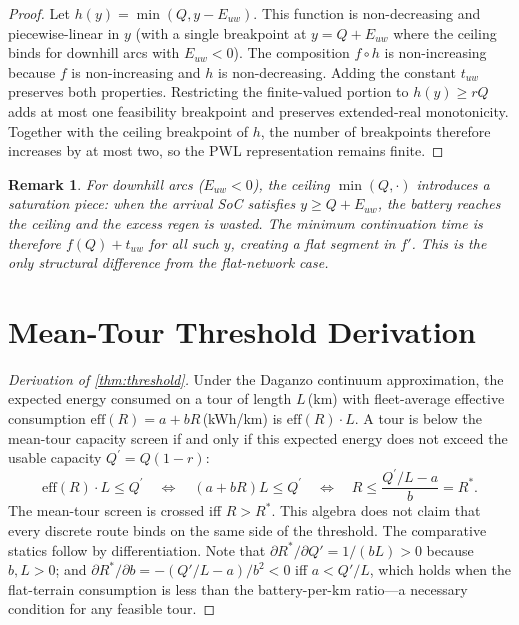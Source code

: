 \documentclass[review,3p,authoryear]{elsarticle}
\newtheorem{remark}[theorem]{Remark}
\newcommand{\Rstar}{R^{*}}
\newcommand{\Qprime}{Q^{\prime}}
\newcommand{\eff}{\mathrm{eff}}
\begin{document}
\begin{proof}
Let $h(y) = \min(Q, y - E_{uw})$.  This function is non-decreasing and
piecewise-linear in $y$ (with a single breakpoint at $y = Q + E_{uw}$ where
the ceiling binds for downhill arcs with $E_{uw} < 0$).  The composition
$f \circ h$ is non-increasing because $f$ is non-increasing and $h$ is
non-decreasing.  Adding the constant $t_{uw}$ preserves both properties.
Restricting the finite-valued portion to $h(y)\ge rQ$ adds at most one
feasibility breakpoint and preserves extended-real monotonicity.
Together with the ceiling breakpoint of $h$, the number of breakpoints
therefore increases by at most two, so the PWL representation remains finite.
\end{proof}

\begin{remark}
For downhill arcs ($E_{uw} < 0$), the ceiling $\min(Q, \cdot)$ introduces a
\emph{saturation piece}: when the arrival SoC satisfies
$y \ge Q + E_{uw}$,
the battery reaches the ceiling and the excess regen is wasted.  The
minimum continuation time is therefore $f(Q) + t_{uw}$ for all such $y$,
creating a flat segment in $f'$.  This is the only structural difference
from the flat-network case.
\end{remark}

\section{Mean-Tour Threshold Derivation}
\label{app:threshold}

\begin{proof}[Derivation of \cref{thm:threshold}]
Under the Daganzo continuum approximation, the expected energy consumed on
a tour of length $L$\,(km) with fleet-average effective consumption
$\eff(R) = a + bR$\,(kWh/km) is $\eff(R) \cdot L$.  A tour is
below the mean-tour capacity screen if and only if this expected energy does
not exceed the usable capacity $\Qprime = Q(1-r)$:
\begin{equation*}
  \eff(R) \cdot L \le \Qprime
  \quad \Longleftrightarrow \quad
  (a + bR) L \le \Qprime
  \quad \Longleftrightarrow \quad
  R \le \frac{\Qprime/L - a}{b} = \Rstar.
\end{equation*}
The mean-tour screen is crossed iff $R > \Rstar$.  This algebra does not
claim that every discrete route binds on the same side of the threshold.
The comparative statics follow by differentiation.  Note that
$\partial\Rstar/\partial Q'
= 1/(bL) > 0$ because $b, L > 0$; and $\partial\Rstar/\partial b =
-(Q'/L - a)/b^2 < 0$ iff $a < Q'/L$, which holds when the flat-terrain
consumption is less than the battery-per-km ratio---a necessary condition
for any feasible tour.
\end{proof}
\end{document}
